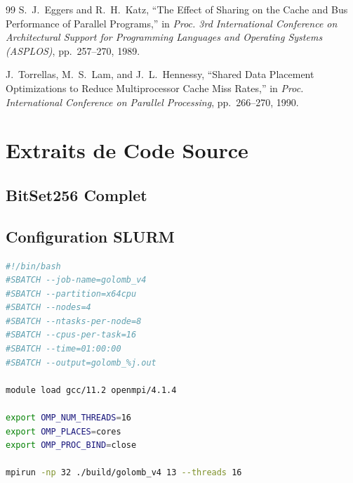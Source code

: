 \documentclass[12pt,a4paper,twoside]{report}
\begin{document}
\begin{thebibliography}{99}
S.~J.~Eggers and R.~H.~Katz, ``The Effect of Sharing on the Cache and Bus Performance of Parallel Programs,'' in \emph{Proc. 3rd International Conference on Architectural Support for Programming Languages and Operating Systems (ASPLOS)}, pp.~257--270, 1989.

J.~Torrellas, M.~S.~Lam, and J.~L.~Hennessy, ``Shared Data Placement Optimizations to Reduce Multiprocessor Cache Miss Rates,'' in \emph{Proc. International Conference on Parallel Processing}, pp.~266--270, 1990.

\end{thebibliography}


\appendix

\chapter{Extraits de Code Source}

\section{BitSet256 Complet}



\section{Configuration SLURM}

\begin{lstlisting}[language=bash, caption={Exemple de script SLURM pour V4}]
#!/bin/bash
#SBATCH --job-name=golomb_v4
#SBATCH --partition=x64cpu
#SBATCH --nodes=4
#SBATCH --ntasks-per-node=8
#SBATCH --cpus-per-task=16
#SBATCH --time=01:00:00
#SBATCH --output=golomb_%j.out

module load gcc/11.2 openmpi/4.1.4

export OMP_NUM_THREADS=16
export OMP_PLACES=cores
export OMP_PROC_BIND=close

mpirun -np 32 ./build/golomb_v4 13 --threads 16
\end{lstlisting}
\end{document}
